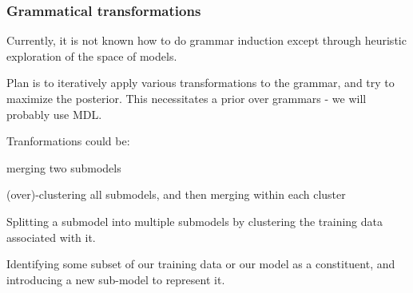 \documentclass{article}
\begin{document}
\subsubsection{Grammatical transformations}

Currently, it is not known how to do grammar induction except through
heuristic exploration of the space of models.

Plan is to iteratively apply various transformations to the grammar,
and try to maximize the posterior. This necessitates a prior over
grammars - we will probably use MDL.

Tranformations could be:
\bitem
\item merging two submodels
\item (over)-clustering all submodels, and then merging within each cluster
\item Splitting a submodel into multiple submodels by clustering the
  training data associated with it.
\item Identifying some subset of our training data or our model as a
  constituent, and introducing a new sub-model to represent it.
\eitem
\end{document}
